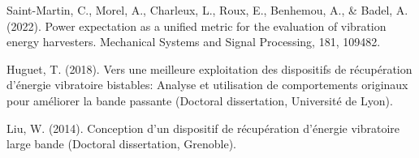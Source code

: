 \documentclass[a4paper, french, 12pt, titlepage]{report}
\begin{document}
Saint-Martin, C., Morel, A., Charleux, L., Roux, E., Benhemou, A., & Badel, A. (2022). Power expectation as a unified metric for the evaluation of vibration energy harvesters. Mechanical Systems and Signal Processing, 181, 109482.

Huguet, T. (2018). Vers une meilleure exploitation des dispositifs de récupération d’énergie vibratoire bistables: Analyse et utilisation de comportements originaux pour améliorer la bande passante (Doctoral dissertation, Université de Lyon).

Liu, W. (2014). Conception d'un dispositif de récupération d'énergie vibratoire large bande (Doctoral dissertation, Grenoble).
\end{document}
